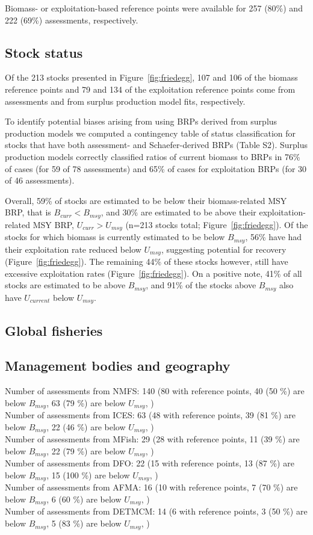 Biomass- or exploitation-based reference points were available for
257 (80\%) and
222 (69\%)
assessments, respectively.

\subsection*{Stock status}
\noindent
Of the
213 stocks presented in
Figure~\ref{fig:friedegg}, 107 and
106 of the biomass reference points and
79 and
134 of the exploitation reference
points come from assessments and from surplus production model fits,
respectively.

To identify potential biases arising from using BRPs
derived from surplus production models we computed a contingency table
of status classification for stocks that have both assessment- and
Schaefer-derived BRPs (Table S2). Surplus production models correctly
classified ratios of current biomass to BRPs in
76\% of cases (for 59
of 78 assessments) and 65\%
of cases for exploitation BRPs (for 30 of
46 assessments).

Overall, 59\% of stocks are estimated
to be below their biomass-related MSY BRP, that is $B_{curr}<B_{msy}$,
and 30\% are estimated to be above
their exploitation-related MSY BRP, $U_{curr}>U_{msy}$
(n=213 stocks total; Figure~\ref{fig:friedegg}).
Of the stocks for which biomass is currently estimated to be below
$B_{msy}$, 56\% have had their
exploitation rate reduced below $U_{msy}$, suggesting potential for
recovery (Figure~\ref{fig:friedegg}). The remaining
44\% of these stocks however,
still have excessive exploitation rates
(Figure~\ref{fig:friedegg}). On a positive note,
41\% of all stocks are estimated to
be above $B_{msy}$, and 91\%
of the stocks above $B_{msy}$ also have $U_{current}$ below $U_{msy}$.


\subsection*{Global fisheries}

\subsection*{Management bodies and geography}
\noindent
Number of assessments from NMFS: 140 (80 with reference points, 40 (50 \%) are below $B_{msy}$, 63 (79 \%) are below $U_{msy}$, ) \\
Number of assessments from ICES: 63 (48 with reference points, 39 (81 \%) are below $B_{msy}$, 22 (46 \%) are below $U_{msy}$, ) \\
Number of assessments from MFish: 29 (28 with reference points, 11 (39 \%) are below $B_{msy}$, 22 (79 \%) are below $U_{msy}$, ) \\
Number of assessments from DFO: 22 (15 with reference points, 13 (87 \%) are below $B_{msy}$, 15 (100 \%) are below $U_{msy}$, ) \\
Number of assessments from AFMA: 16 (10 with reference points, 7 (70 \%) are below $B_{msy}$, 6 (60 \%) are below $U_{msy}$, ) \\
Number of assessments from DETMCM: 14 (6 with reference points, 3 (50 \%) are below $B_{msy}$, 5 (83 \%) are below $U_{msy}$, ) \\

